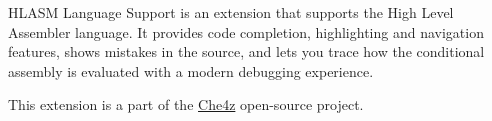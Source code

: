 HLASM Language Support is an extension that supports the High Level Assembler language. It provides code completion, highlighting and navigation features, shows mistakes in the source, and lets you trace how the conditional assembly is evaluated with a modern debugging experience.

This extension is a part of the \href{https://github.com/eclipse/che-che4z}{Che4z} open-source project.